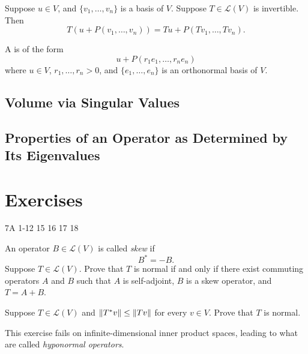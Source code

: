 \begin{proposition}
Suppose $u\in V$, and $\{v_1,\dots,v_n\}$ is a basis of $V$. Suppose $T\in\mathcal{L}(V)$ is invertible. Then
\[T(u+P(v_1,\dots,v_n))=Tu+P(Tv_1,\dots,Tv_n).\]
\end{proposition}

\begin{definition}[Box]
A  is of the form
\[u+P(r_1e_1,\dots,r_ne_n)\]
where $u\in V$, $r_1,\dots,r_n>0$, and $\{e_1,\dots,e_n\}$ is an orthonormal basis of $V$.
\end{definition}

\subsection{Volume via Singular Values}
\subsection{Properties of an Operator as Determined by Its Eigenvalues}
\pagebreak

\section*{Exercises}
7A 1-12 15 16 17 18

\begin{exercise}
An operator $B\in\mathcal{L}(V)$ is called \emph{skew} if
\[B^*=-B.\]
Suppose $T\in\mathcal{L}(V)$. Prove that $T$ is normal if and only if there exist commuting operators $A$ and $B$ such that $A$ is self-adjoint, $B$ is a skew operator, and $T=A+B$.
\end{exercise}

\begin{solution}

\end{solution}

\begin{exercise}
Suppose $T\in\mathcal{L}(V)$ and $\norm{T^*v}\le\norm{Tv}$ for every $v\in V$. 
Prove that $T$ is normal.
\end{exercise}

\begin{remark}
This exercise fails on infinite-dimensional inner product spaces, leading to what are called \emph{hyponormal operators}.
\end{remark}

